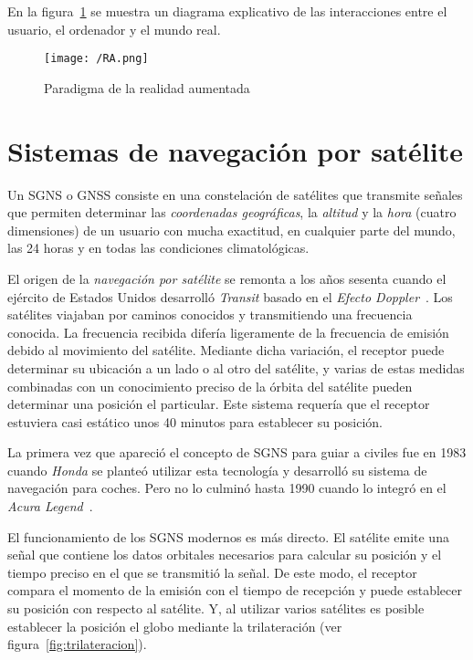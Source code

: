En la figura~\ref{fig:ra} se muestra un diagrama explicativo de las interacciones entre el usuario,
el ordenador y el mundo real.

\begin{figure}[!h]
  \begin{center}
    \texttt{[image: /RA.png]}
    \caption{Paradigma de la realidad aumentada}
    \label{fig:ra}
  \end{center}
\end{figure}

\section{Sistemas de navegación por satélite}

Un \acs{SGNS} o \acs{GNSS} consiste en una constelación de satélites que transmite señales que
permiten determinar las \emph{coordenadas geográficas}, la \emph{altitud} y la \emph{hora} (cuatro
dimensiones) de un usuario con mucha exactitud, en cualquier parte del mundo, las 24 horas y en
todas las condiciones climatológicas.

El origen de la \emph{navegación por satélite} se remonta a los años sesenta cuando el ejército de
Estados Unidos desarrolló \emph{Transit} basado en el \emph{Efecto Doppler}~\cite{SN}. Los satélites
viajaban por caminos conocidos y transmitiendo una frecuencia conocida. La frecuencia recibida
difería ligeramente de la frecuencia de emisión debido al movimiento del satélite. Mediante dicha
variación, el receptor puede determinar su ubicación a un lado o al otro del satélite, y varias de
estas medidas combinadas con un conocimiento preciso de la órbita del satélite pueden determinar
una posición el particular. Este sistema requería que el receptor estuviera casi estático unos 40
minutos para establecer su posición.

La primera vez que apareció el concepto de \acs{SGNS} para guiar a civiles fue en 1983 cuando
\emph{Honda} se planteó utilizar esta tecnología y desarrolló su sistema de navegación para
coches. Pero no lo culminó hasta 1990 cuando lo integró en el \emph{Acura Legend}~\cite{Parra13}.

El funcionamiento de los \acs{SGNS} modernos es más directo. El satélite emite una señal que
contiene los datos orbitales necesarios para calcular su posición y el tiempo preciso en el que se
transmitió la señal. De este modo, el receptor compara el momento de la emisión con el tiempo de
recepción y puede establecer su posición con respecto al satélite. Y, al utilizar varios satélites
es posible establecer la posición el globo mediante la trilateración (ver
figura~\ref{fig:trilateracion}). \\

